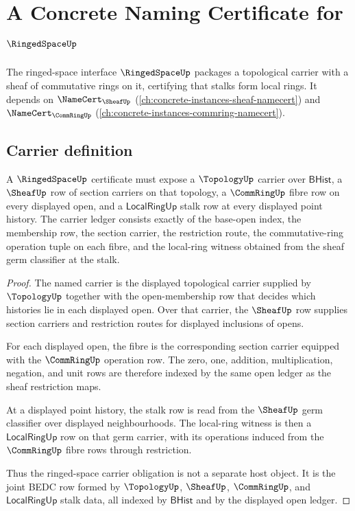 \chapter{A Concrete Naming Certificate for $\RingedSpaceUp$}
\label{ch:concrete-instances-ringedspace-namecert}

The ringed-space interface $\RingedSpaceUp$ packages a topological carrier with a sheaf of commutative rings on it, certifying that stalks form local rings. It depends on $\NameCert_{\SheafUp}$ (\autoref{ch:concrete-instances-sheaf-namecert}) and $\NameCert_{\CommRingUp}$ (\autoref{ch:concrete-instances-commring-namecert}).

\section{Carrier definition}
\label{sec:ringedspace-carrier}

\begin{theorem}\label{thm:ringedspace-carrier-and-stalk-obligation}
A $\RingedSpaceUp$ certificate must expose a $\TopologyUp$ carrier over $\mathsf{BHist}$, a $\SheafUp$ row of section carriers on that topology, a $\CommRingUp$ fibre row on every displayed open, and a $\mathsf{LocalRingUp}$ stalk row at every displayed point history. The carrier ledger consists exactly of the base-open index, the membership row, the section carrier, the restriction route, the commutative-ring operation tuple on each fibre, and the local-ring witness obtained from the sheaf germ classifier at the stalk.
\end{theorem}
\begin{proof}
The named carrier is the displayed topological carrier supplied by $\TopologyUp$ together with the open-membership row that decides which histories lie in each displayed open. Over that carrier, the $\SheafUp$ row supplies section carriers and restriction routes for displayed inclusions of opens.

For each displayed open, the fibre is the corresponding section carrier equipped with the $\CommRingUp$ operation row. The zero, one, addition, multiplication, negation, and unit rows are therefore indexed by the same open ledger as the sheaf restriction maps.

At a displayed point history, the stalk row is read from the $\SheafUp$ germ classifier over displayed neighbourhoods. The local-ring witness is then a $\mathsf{LocalRingUp}$ row on that germ carrier, with its operations induced from the $\CommRingUp$ fibre rows through restriction.

Thus the ringed-space carrier obligation is not a separate host object. It is the joint BEDC row formed by $\TopologyUp$, $\SheafUp$, $\CommRingUp$, and $\mathsf{LocalRingUp}$ stalk data, all indexed by $\mathsf{BHist}$ and by the displayed open ledger.
\end{proof}

